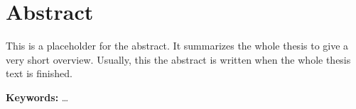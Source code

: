 \chapter*{Abstract}
\label{cha:abstract}
 

This is a placeholder for the abstract. It summarizes the whole thesis
to give a very short overview. Usually, this the abstract is written
when the whole thesis text is finished.

\textbf{Keywords: } \ldots
